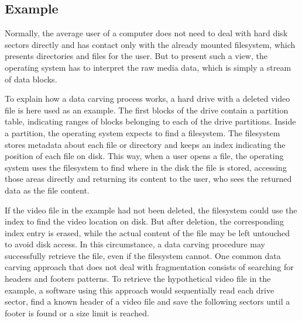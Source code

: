 
\subsection{Example}

Normally, the average user of a computer does not need to deal with hard disk sectors directly and has contact only with the already mounted filesystem, which presents directories and files for the user. But to present such a view, the operating system has to interpret the raw media data, which is simply a stream of data blocks.

To explain how a data carving process works, a hard drive with a deleted video file is here used as an example.
The first blocks of the drive contain a partition table, indicating ranges of blocks belonging to each of the drive partitions. Inside a partition, the operating system expects to find a filesystem. The filesystem stores metadata about each file or directory and keeps an index indicating the position of each file on disk. This way, when a user opens a file, the operating system uses the filesystem to find where in the disk the file is stored, accessing those areas directly and returning its content to the user, who sees the returned data as the file content. 
 
If the video file in the example had not been deleted, the filesystem could use the index to find the video location on disk. But after deletion, the corresponding index entry is erased, while the actual content of the file may be left untouched to avoid disk access. In this circumstance, a data carving procedure may successfully retrieve the file, even if the filesystem cannot. One common data carving approach that does not deal with fragmentation consists of searching for headers and footers patterns. To retrieve the hypothetical video file in the example, a software using this approach would sequentially read each drive sector, find a known header of a video file and save the following sectors until a footer is found or a size limit is reached. 
